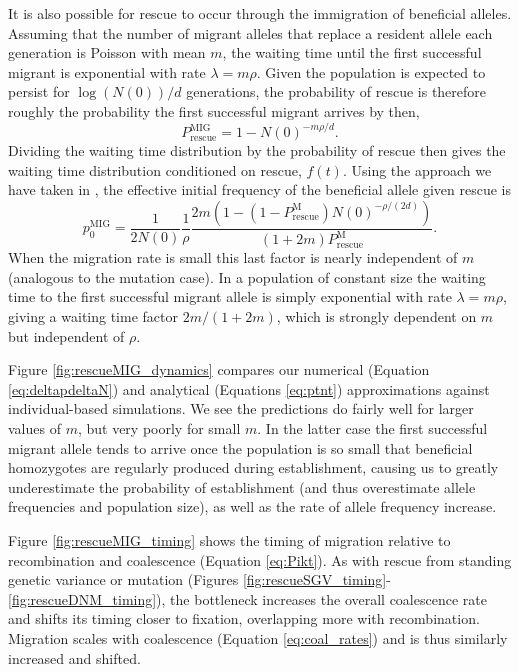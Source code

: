 \documentclass[]{article}
\begin{document}
It is also possible for rescue to occur through the immigration of beneficial alleles.
Assuming that the number of migrant alleles that replace a resident allele each generation is Poisson with mean $m$, the waiting time until the first successful migrant is exponential with rate $\lambda = m \rho$.
Given the population is expected to persist for $\log(N(0))/d$ generations, the probability of rescue is therefore roughly the probability the first successful migrant arrives by then,
\begin{equation}
P_\mathrm{rescue}^\mathrm{MIG} = 1 - N(0)^{-m \rho/d}.
\end{equation}
Dividing the waiting time distribution by the probability of rescue then gives the waiting time distribution conditioned on rescue, $f(t)$.
Using the approach we have taken in , the effective initial frequency of the beneficial allele given rescue is
\begin{equation}\label{eq:p0m}
p_0^\mathrm{MIG} = \frac{1}{2N(0)}\frac{1}{\rho}\frac{2m \left( 1 - (1-P_\mathrm{rescue}^\mathrm{M})  N(0)^{-\rho/(2d)} \right)}{(1+2m)P_\mathrm{rescue}^\mathrm{M}}.
\end{equation}
When the migration rate is small this last factor is nearly independent of $m$ (analogous to the mutation case).
In a population of constant size the waiting time to the first successful migrant allele is simply exponential with rate $\lambda = m \rho$, giving a waiting time factor $2m/(1+2m)$, which is strongly dependent on $m$ but independent of $\rho$.

Figure \ref{fig:rescueMIG_dynamics} compares our numerical (Equation \ref{eq:deltapdeltaN}) and analytical (Equations \ref{eq:ptnt}) approximations against individual-based simulations.
We see the predictions do fairly well for larger values of $m$, but very poorly for small $m$.
In the latter case the first successful migrant allele tends to arrive once the population is so small that beneficial homozygotes are regularly produced during establishment, causing us to greatly underestimate the probability of establishment (and thus overestimate allele frequencies and population size), as well as the rate of allele frequency increase.

Figure \ref{fig:rescueMIG_timing} shows the timing of migration relative to recombination and coalescence (Equation \ref{eq:Pikt}).
As with rescue from standing genetic variance or mutation (Figures \ref{fig:rescueSGV_timing}-\ref{fig:rescueDNM_timing}), the bottleneck increases the overall coalescence rate and shifts its timing closer to fixation, overlapping more with recombination. 
Migration scales with coalescence (Equation \ref{eq:coal_rates}) and is thus similarly increased and shifted.
\end{document}
